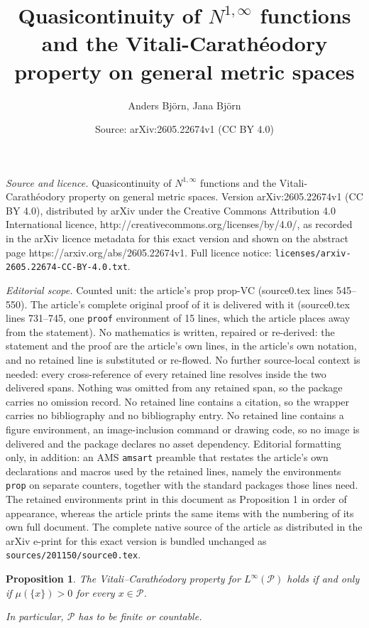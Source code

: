 \documentclass[10pt,a4paper]{amsart}
\title{Quasicontinuity of $N^{1,\infty}$ functions and the Vitali-Carath\'eodory property on general metric spaces}
\author{Anders Bj\"orn, Jana Bj\"orn}
\date{Source: arXiv:2605.22674v1 (CC BY 4.0)}
\newtheorem{prop}{Proposition}
\renewcommand{\P}{\mathcal{P}}
\begin{document}
\maketitle

\noindent\emph{Source and licence.} Quasicontinuity of $N^{1,\infty}$ functions and the Vitali-Carath\'eodory property on general metric spaces. Version arXiv:2605.22674v1 (CC BY 4.0), distributed by arXiv under the Creative Commons Attribution 4.0 International licence, http://creativecommons.org/licenses/by/4.0/, as recorded in the arXiv licence metadata for this exact version and shown on the abstract page https://arxiv.org/abs/2605.22674v1. Full licence notice: \texttt{licenses/arxiv-2605.22674-CC-BY-4.0.txt}.\par\smallskip

\noindent\textit{Editorial scope.} Counted unit: the article's prop prop-VC (source0.tex lines 545--550). The article's complete original proof of it is delivered with it (source0.tex lines 731--745, one \texttt{proof} environment of 15 lines, which the article places away from the statement). No mathematics is written, repaired or re-derived: the statement and the proof are the article's own lines, in the article's own notation, and no retained line is substituted or re-flowed.  No further source-local context is needed: every cross-reference of every retained line resolves inside the two delivered spans.  Nothing was omitted from any retained span, so the package carries no omission record.  No retained line contains a citation, so the wrapper carries no bibliography and no bibliography entry.  No retained line contains a figure environment, an image-inclusion command or drawing code, so no image is delivered and the package declares no asset dependency.  Editorial formatting only, in addition: an AMS \texttt{amsart} preamble that restates the article's own declarations and macros used by the retained lines, namely the environments \texttt{prop} on separate counters, together with the standard packages those lines need.  The retained environments print in this document as Proposition 1 in order of appearance, whereas the article prints the same items with the numbering of its own full document.  The complete native source of the article as distributed in the arXiv e-print for this exact version is bundled unchanged as \texttt{sources/201150/source0.tex}.
\begin{prop}  \label{prop-VC}
The Vitali--Carath\'eodory property for $L^\infty(\P)$ holds if and only if
$\mu(\{x\})>0$ for every $x\in\P$.

In particular, $\P$ has to be finite or countable.
\end{prop}
\end{document}
